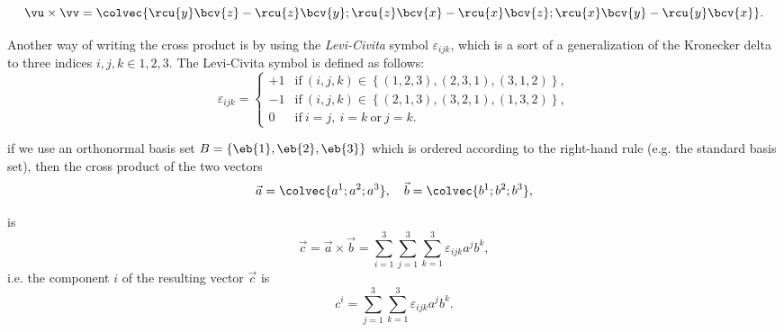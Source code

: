 \begin{equation}
  \vu\times\vv = \colvec{\rcu{y}\bcv{z}-\rcu{z}\bcv{y};\rcu{z}\bcv{x}-\rcu{x}\bcv{z};\rcu{x}\bcv{y}-\rcu{y}\bcv{x}}.
	\label{eq:cross product calculation}
\end{equation}

Another way of writing the cross product is by using the \emph{Levi-Civita} symbol $\varepsilon_{ijk}$, which is a sort of a generalization of the Kronecker delta to three indices $i,j,k\in{1,2,3}$. The Levi-Civita symbol is defined as follows:
\begin{equation}
  \varepsilon_{ijk} = \begin{cases}
    +1 & \text{if}\ (i,j,k)\in\left\{(1,2,3),(2,3,1),(3,1,2)\right\},\\
    -1 & \text{if}\ (i,j,k)\in\left\{(2,1,3),(3,2,1),(1,3,2)\right\},\\
    0 & \text{if}\ i=j,\ i=k\ \text{or}\ j=k.
                      \end{cases}
  \label{eq:Levi-Civita symbol}
\end{equation}


if we use an orthonormal basis set $B=\left\{\eb{1},\eb{2},\eb{3}\right\}$ which is ordered according to the right-hand rule (e.g. the standard basis set), then the cross product of the two vectors
\[
  \vec{a}=\colvec{a^{1};a^{2};a^{3}},\quad\vec{b}=\colvec{b^{1};b^{2};b^{3}},
\]

is
\begin{equation}
  \vec{c} = \vec{a}\times\vec{b} = \sum\limits_{i=1}^{3}\sum\limits_{j=1}^{3}\sum\limits_{k=1}^{3}\varepsilon_{ijk}a^{j}b^{k},
  \label{eq:cross_product_LCsymbol}
\end{equation}
i.e. the component $i$ of the resulting vector $\vec{c}$ is
\begin{equation}
  c^{i} = \sum\limits_{j=1}^{3}\sum\limits_{k=1}^{3}\varepsilon_{ijk}a^{j}b^{k}.
  \label{eq:cross_product_LCsymbol_component}
\end{equation}


